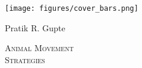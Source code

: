 
\begin{titlepage}
    \pagecolor{white}\afterpage{\nopagecolor}
    \begin{addmargin}[-1cm]{-3cm}
        \linespread{1.5}

        \hfill

        {
          \begin{flushleft}
            \par
          \end{flushleft}
        }
        \texttt{[image: figures/cover\_bars.png]}
        \vspace{81mm}

        {\color{Plum4}\sffamily\huge{Pratik R. Gupte}}

        \vfill

        \newpage


        \linespread{1.5}

        \hfill

        \cleardoublepage

        {
          \begin{flushleft}
            {\Huge \scshape{Animal Movement\\Strategies}\par}\par
          \end{flushleft}
        }
  \end{addmargin}
\end{titlepage}

\nopagecolor
